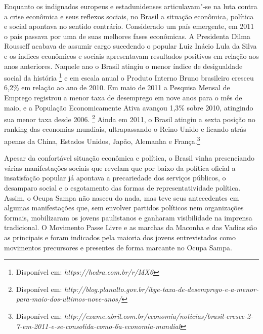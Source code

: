 Enquanto os indignados europeus e estadunidenses articulavam"-se na luta
contra a crise econômica e seus reflexos sociais, no Brasil a situação
econômica, política e social apontava no sentido contrário. Considerado
um país emergente, em 2011 o país passava por uma de suas melhores fases
econômicas. A Presidenta Dilma Rousseff acabava de assumir cargo
sucedendo o popular Luiz Inácio Lula da Silva e os índices econômicos e
sociais apresentavam resultados positivos em relação aos anos
anteriores. Naquele ano o Brasil atingiu o menor índice de desigualdade
social da história \footnote{Disponível em:
  \emph{https://hedra.com.br/r/MX6}}
e em escala anual o Produto Interno Bruno brasileiro cresceu 6,2\% em
relação ao ano de 2010. %
Em maio de 2011 a Pesquisa Mensal de Emprego registrou a menor taxa de
desemprego em nove anos para o mês de maio, e a População Economicamente
Ativa avançou 1,3\% sobre 2010, atingindo sua menor taxa desde 2006.
\footnote{Disponível em:
  \emph{http://blog.planalto.gov.br/ibge-taxa-de-desemprego-e-a-menor-para-maio-dos-ultimos-nove-anos/}}
Ainda em 2011, o Brasil atingiu a sexta posição no ranking das economias
mundiais, ultrapassando o Reino Unido e ficando atrás apenas da China,
Estados Unidos, Japão, Alemanha e França.\footnote{Disponível em:
  \emph{http://exame.abril.com.br/economia/noticias/brasil-cresce-2-7-em-2011-e-se-consolida-como-6a-economia-mundial}}

Apesar da confortável situação econômica e política, o Brasil vinha
presenciando várias manifestações sociais que revelam que por baixo da
política oficial a insatisfação popular já apontava a precariedade dos
serviços públicos, o desamparo social e o esgotamento das formas de
representatividade política. Assim, o Ocupa Sampa não nasceu do nada,
mas teve seus antecedentes em algumas manifestações que, sem envolver
partidos políticos nem organizações formais, mobilizaram os jovens
paulistanos e ganharam visibilidade na imprensa tradicional. O Movimento
Passe Livre e as marchas da Maconha e das Vadias são as principais e
foram indicados pela maioria dos jovens entrevistados como movimentos
precursores e presentes de forma marcante no Ocupa Sampa.

